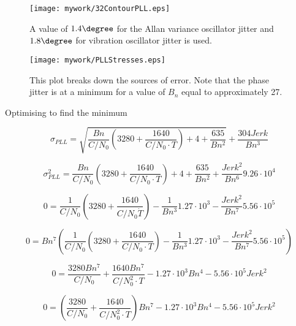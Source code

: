 \begin{figure}[!htb] 
    \centering
    \texttt{[image: mywork/32ContourPLL.eps]} 
    \caption{A value of $1.4\degree$ for the Allan variance oscillator jitter and $1.8\degree$ for vibration oscillator jitter is used.}
\end{figure}


\begin{figure}[!htb] 
    \centering
    \texttt{[image: mywork/PLLStresses.eps]} 
    \caption{This plot breaks down the sources of error. Note that the phase jitter is at a minimum for a value of $B_n$ equal to approximately 27.}
\end{figure}


Optimising to find the minimum

\begin{equation}
\sigma_{PLL} = \sqrt{\frac{Bn}{C/N_0} \left(3280 + \frac{1640}{C/N_0 \cdot T}\right) + 4 + \frac{635}{Bn^{2}}} + \frac{304 Jerk}{Bn^{3}}
\end{equation}


\begin{equation}
\sigma_{PLL}^2 = \frac{Bn}{C/N_0} \left(3280 + \frac{1640}{C/N_0 \cdot T}\right) + 4 + \frac{635}{Bn^{2}} + \frac{Jerk^{2}}{Bn^{6}} 9.26 \cdot 10^{4}
\end{equation}


\begin{equation}
0=\frac{1}{C/N_0} \left(3280 + \frac{1640}{C/N_0 \dot T}\right) - \frac{1}{Bn^{3}} 1.27 \cdot 10^{3} - \frac{Jerk^{2}}{Bn^{7}} 5.56 \cdot 10^{5}
\end{equation}


\begin{equation}
0=Bn^{7} \left(\frac{1}{C/N_0} \left(3280 + \frac{1640}{C/N_0 \cdot T}\right) - \frac{1}{Bn^{3}} 1.27 \cdot 10^{3} - \frac{Jerk^{2}}{Bn^{7}} 5.56 \cdot 10^{5}\right)
\end{equation}



\begin{equation}
0=\frac{3280 Bn^{7}}{C/N_0} + \frac{1640 Bn^{7}}{C/N_0^{2} \cdot T} - 1.27 \cdot 10^{3} Bn^{4} - 5.56 \cdot 10^{5} Jerk^{2}
\end{equation}



\begin{equation}
0=(\frac{3280}{C/N_0} + \frac{1640}{C/N_0^{2} \cdot T})Bn^{7}  - 1.27 \cdot 10^{3} Bn^{4} - 5.56 \cdot 10^{5} Jerk^{2}
\end{equation}




